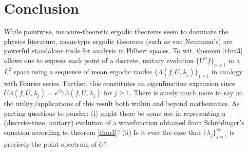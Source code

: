 \documentclass[11pt]{report}
\newcommand{\1}[1]{\mathbbm{1}_{\{#1\}}}
\theoremstyle{definition}
\begin{document}
    \section{Conclusion}\label{sec5} While pointwise, measure-theoretic ergodic
    theorems seem to dominate the physics literature, mean-type ergodic theorems
    (such as von Neumann's) are powerful standalone tools for analysis in
    Hilbert spaces. To wit, theorem \ref{thm3} allows one to express each point
    of a discrete, unitary evolution $\{U^nf\}_{n\geq 1}$ in a $L^2$ space using
    a sequence of mean ergodic modes $\{\Lambda(f,U,\lambda_j)\}_{j\geq 1}$ in
    analogy with Fourier series. Further, this constitutes an eigenfunction
    expansion since
    $U\Lambda(f,U,\lambda_j)=e^{i\lambda_j}\Lambda(f,U,\lambda_j)$ for $j\geq
    1$. There is surely much more to say on the utility/applications of this
    result both within and beyond mathematics. As parting questions to ponder: (i) might there be some use in representing a
    (discrete-time, unitary) evolution of a wavefunction obtained from
    Schr\"odinger's equation according to theorem \ref{thm3}? (ii) Is it ever the case that
    $\{\lambda_j\}_{j=1}^\infty$ is precisely the point spectrum of $U$?


    \newpage
    
    
\end{document}
